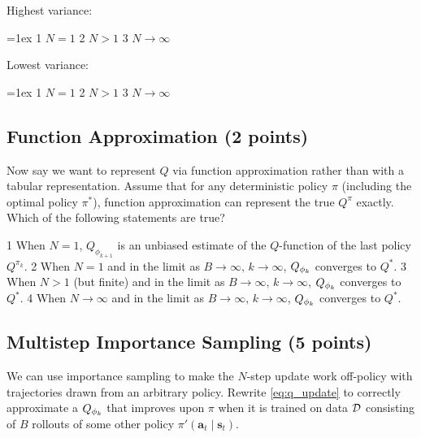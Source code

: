 \def\highest{3} %
\def\lowest{1} %
\ifsolutions\solve\thesubsection\fi
\begin{minipage}{0.49\linewidth}
Highest variance:\smallskip
\begin{itemize}\itemsep=1ex
    \checkeditem\highest1 $N = 1$
    \checkeditem\highest2 $N > 1$
    \checkeditem\highest3 $N \to \infty$
\end{itemize}
\end{minipage}
\begin{minipage}{0.49\linewidth}
Lowest variance:\smallskip
\begin{itemize}\itemsep=1ex
    \checkeditem\lowest1 $N = 1$
    \checkeditem\lowest2 $N > 1$
    \checkeditem\lowest3 $N \to \infty$
\end{itemize}
\end{minipage}

\subsection{Function Approximation (2 points)}
\label{q:function_approximation}
Now say we want to represent $Q$ via function approximation rather than with a tabular representation. Assume that for any deterministic policy $\pi$ (including the optimal policy $\pi^*$), function approximation can represent the true $Q^\pi$ exactly.
Which of the following statements are true?

\def\answer{234} %
\ifsolutions\solve\thesubsection\fi
\begin{itemize}
    \checkeditem\answer1 When $N = 1$, $Q_{\phi_{k+1}}$ is an unbiased estimate of the $Q$-function of the last policy $Q^{\pi_k}$.
    \checkeditem\answer2 When $N = 1$ and in the limit as $B\to\infty,\,k \to \infty$, $Q_{\phi_k}$ converges to $Q^*$.
    \checkeditem\answer3 When $N > 1$ (but finite) and in the limit as $B\to\infty,\,k \to \infty$, $Q_{\phi_k}$ converges to $Q^*$.
    \checkeditem\answer4 When $N \to \infty$ and in the limit as $B \to \infty,\,k \to \infty$, $Q_{\phi_k}$ converges to $Q^*$.
\end{itemize}

\subsection{Multistep Importance Sampling (5 points)}
\label{q:importance_sampling}

We can use importance sampling to make the $N$-step update work off-policy with trajectories drawn from an arbitrary policy. Rewrite \eqref{eq:q_update} to correctly approximate a $Q_{\phi_k}$ that improves upon $\pi$ when it is trained on data $\mathcal{D}$ consisting of $B$ rollouts of some other policy $\pi'(\mathbf a_t\mid\mathbf s_t)$. 

